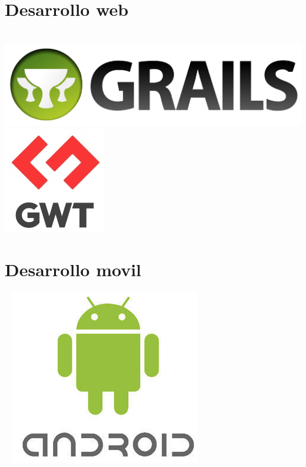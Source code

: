 \documentclass[]{friggeri-cv}
\begin{document}
\begin{aside}
    \section{Desarrollo web}
    ~
    \includegraphics[scale=0.02]{img/grails.png}
    \includegraphics[scale=0.2]{img/gwt.png}
    ~
    \section{Desarrollo movil}
    ~
    \includegraphics[scale=0.20]{img/android}
\end{aside}
\end{document}
